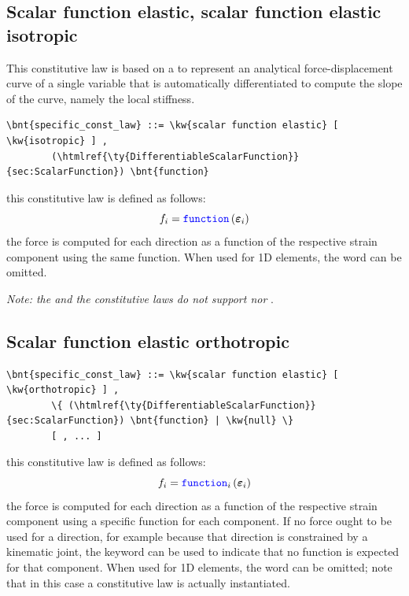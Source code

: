 \subsection{Scalar function elastic, scalar function elastic isotropic}
This constitutive law is based on a 
to represent an analytical force-displacement curve 
of a single variable that is automatically differentiated 
to compute the slope of the curve, namely the local stiffness.
\begin{Verbatim}[commandchars=\\\{\}]
    \bnt{specific_const_law} ::= \kw{scalar function elastic} [ \kw{isotropic} ] ,
        (\htmlref{\ty{DifferentiableScalarFunction}}{sec:ScalarFunction}) \bnt{function}
\end{Verbatim}
this constitutive law is defined as follows:
\begin{displaymath}
	f_i = \textcolor{blue}{\texttt{function}}\left( \boldsymbol{\varepsilon}_i \right)
\end{displaymath}
the force is computed for each direction as a function of the respective
strain component using the same function.
When used for 1D elements, the word  can be omitted.

\bigskip
\noindent
\emph{Note: the  and the  constitutive laws do not support  nor }.

\subsection{Scalar function elastic orthotropic}
\begin{Verbatim}[commandchars=\\\{\}]
    \bnt{specific_const_law} ::= \kw{scalar function elastic} [ \kw{orthotropic} ] ,
        \{ (\htmlref{\ty{DifferentiableScalarFunction}}{sec:ScalarFunction}) \bnt{function} | \kw{null} \}
        [ , ... ]
\end{Verbatim}
this constitutive law is defined as follows:
\begin{displaymath}
	f_i = \textcolor{blue}{\texttt{function}}_i \left( \boldsymbol{\varepsilon}_i \right)
\end{displaymath}
the force is computed for each direction as a function of the respective
strain component using a specific function for each component.
If no force ought to be used for a direction, for example because 
that direction is constrained by a kinematic joint, the keyword 
can be used to indicate that no function is expected for that component.
When used for 1D elements, the word  can be omitted;
note that in this case a 
constitutive law is actually instantiated.

